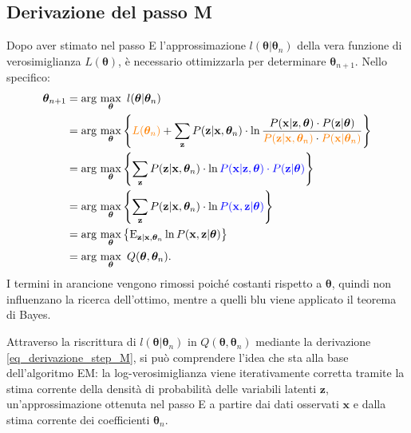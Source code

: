 \subsection{Derivazione del passo M}
Dopo aver stimato nel passo E l'approssimazione $l(\boldsymbol{\theta}|\boldsymbol{\theta}_n)$  della vera funzione di verosimiglianza $L(\boldsymbol{\theta})$, è necessario ottimizzarla per determinare $\boldsymbol{\theta}_{n+1}$. Nello specifico:
\begin{equation}
	\begin{split}
		\boldsymbol{\theta}_{n+1} & = \text{arg}\,\max\limits_{\boldsymbol{\theta}}\  l(\boldsymbol{\theta}|\boldsymbol{\theta}_n) \\
		& =  \text{arg}\,\max\limits_{\boldsymbol{\theta}}\left\{ \textcolor{orange}{L(\boldsymbol{\theta}_n)} + \sum_{\mathbf{z}}^{} P(\mathbf{z}|\mathbf{x},\boldsymbol{\theta}_n)\cdot\ln\frac{P(\mathbf{x}|\mathbf{z},\boldsymbol{\theta})\cdot P(\mathbf{z}|\boldsymbol{\theta})}{\textcolor{orange}{P(\mathbf{z}|\mathbf{x},\boldsymbol{\theta}_n)}\cdot\textcolor{orange}{P(\mathbf{x}|\boldsymbol{\theta}_n)}}\right\} \\
		& = \text{arg}\,\max\limits_{\boldsymbol{\theta}}\left\{\sum_{\mathbf{z}}^{} P(\mathbf{z}|\mathbf{x},\boldsymbol{\theta}_n)\cdot\ln\textcolor{blue}{ P(\mathbf{x}|\mathbf{z},\boldsymbol{\theta})\cdot P(\mathbf{z}|\boldsymbol{\theta})}\right\}\\
		& = \text{arg}\,\max\limits_{\boldsymbol{\theta}}\left\{\sum_{\mathbf{z}}^{}P(\mathbf{z}|\mathbf{x},\boldsymbol{\theta}_n)\cdot\ln \textcolor{blue}{P(\mathbf{x},\mathbf{z}|\boldsymbol{\theta})}\right\}\\
		& = \text{arg}\,\max\limits_{\boldsymbol{\theta}}\left\{\text{E}_{\mathbf{z}|\mathbf{x},\boldsymbol{\theta}_n}\ln P(\mathbf{x},\mathbf{z}|\boldsymbol{\theta})\right\}\\
		& = \text{arg}\,\max\limits_{\boldsymbol{\theta}}\ Q(\boldsymbol{\theta},\boldsymbol{\theta}_n).
	\end{split}
\label{eq_derivazione_step_M}
\end{equation}
I termini in arancione vengono rimossi poiché costanti rispetto a $\boldsymbol{\theta}$, quindi non influenzano la ricerca dell'ottimo, mentre a quelli blu viene applicato il teorema di Bayes. \par Attraverso la riscrittura di $l(\boldsymbol{\theta}|\boldsymbol{\theta}_n)$ in $Q(\boldsymbol{\theta},\boldsymbol{\theta}_n)$ mediante la derivazione \ref{eq_derivazione_step_M}, si può comprendere l'idea che sta alla base dell'algoritmo EM: la log-verosimiglianza viene iterativamente corretta tramite la stima corrente della densità di probabilità delle variabili latenti $\mathbf{z}$, un'approssimazione ottenuta nel passo E a partire dai dati osservati $\mathbf{x}$ e dalla stima corrente dei coefficienti $\boldsymbol{\theta}_n$.
